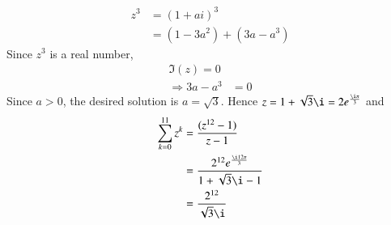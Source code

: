 \begin{align}
z^3&=(1+ai)^3 \\
&=(1-3a^2)+(3a-a^3)
\end{align}
 Since $z^3$ is a real number,
\begin{align}
\Im(z)=0 \\
\Rightarrow 3a-a^3&=0
\end{align}
%
Since $a > 0$, the desired solution is $a = \sqrt{3}$.
Hence $z=1+\sqrt{3}\i= 2e^{\frac{\i\pi}{3}}$ and
\begin{align}
  \displaystyle\sum\limits_{k=0}^{11} z^k &= \displaystyle\frac{(z^{12}-1)}{z-1}   \\
&=\frac{2^{12}e^{\frac{\i12\pi}{3}}}{1+\sqrt{3}\i-1}\\ 
&=\frac{2^{12}}{\sqrt{3}\i}
\end{align}

